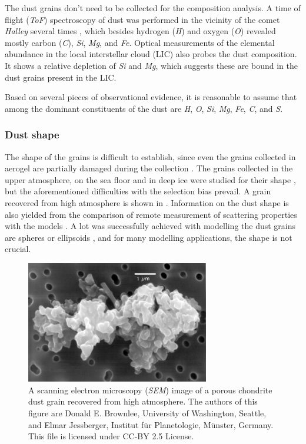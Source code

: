 The dust grains don't need to be collected for the composition analysis. A time of flight (\textit{ToF}) spectroscopy of dust was performed in the vicinity of the comet \textit{Halley} several times \citep{jessberger1988aspects}, which besides hydrogen (\textit{H}) and oxygen (\textit{O}) revealed mostly carbon (\textit{C}), \textit{Si}, \textit{Mg}, and \textit{Fe}. Optical measurements of the elemental abundance in the local interstellar cloud (LIC) also probes the dust composition. It shows a relative depletion of \textit{Si} and \textit{Mg}, which suggests these are bound in the dust grains present in the LIC. 

Based on several pieces of observational evidence, it is reasonable to assume that among the dominant constituents of the dust are \textit{H}, \textit{O}, \textit{Si}, \textit{Mg}, \textit{Fe}, \textit{C}, and \textit{S}.

\subsubsection{Dust shape}

The shape of the grains is difficult to establish, since even the grains collected in aerogel are partially damaged during the collection \citep{burchell2006cosmic}. The grains collected in the upper atmosphere, on the sea floor and in deep ice were studied for their shape \citep{jessberger2001properties}, but the aforementioned difficulties with the selection bias prevail. A grain recovered from high atmosphere is shown in . Information on the dust shape is also yielded from the comparison of remote measurement of scattering properties with the models \citep{min2005modeling}. A lot was successfully achieved with modelling the dust grains are spheres or ellipsoids \citep{mann2010interstellar}, and for many modelling applications, the shape is not crucial.

\begin{figure}[h]
 	\centering
 	\includegraphics[width=8cm]{figures/grain.jpg}
 	\caption{A scanning electron microscopy (\textit{SEM}) image of a porous chondrite dust grain recovered from high atmosphere.  The authors of this figure are Donald E. Brownlee, University of Washington, Seattle, and Elmar Jessberger, Institut für Planetologie, Münster, Germany.
This file is licensed under CC-BY 2.5 License.}
 	\label{fig:dust_grain}
\end{figure}

